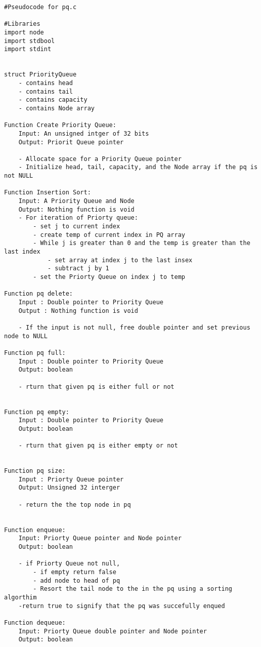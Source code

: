 \documentclass[11pt]{article} %
\begin{document}
\begin{flushleft}
\begin{lstlisting}
#Pseudocode for pq.c

#Libraries 
import node
import stdbool
import stdint


struct PriorityQueue
    - contains head
    - contains tail
    - contains capacity
    - contains Node array

Function Create Priority Queue:
    Input: An unsigned intger of 32 bits
    Output: Priorit Queue pointer
    
    - Allocate space for a Priority Queue pointer
    - Initialize head, tail, capacity, and the Node array if the pq is not NULL

Function Insertion Sort:
    Input: A Priority Queue and Node
    Output: Nothing function is void
    - For iteration of Priorty queue:
        - set j to current index
        - create temp of current index in PQ array
        - While j is greater than 0 and the temp is greater than the last index
            - set array at index j to the last insex
            - subtract j by 1
        - set the Priorty Queue on index j to temp

Function pq delete:
    Input : Double pointer to Priority Queue
    Output : Nothing function is void

    - If the input is not null, free double pointer and set previous node to NULL

Function pq full:
    Input : Double pointer to Priority Queue
    Output: boolean
    
    - rturn that given pq is either full or not


Function pq empty:
    Input : Double pointer to Priority Queue
    Output: boolean
    
    - rturn that given pq is either empty or not


Function pq size:
    Input : Priorty Queue pointer
    Output: Unsigned 32 interger
    
    - return the the top node in pq 


Function enqueue:
    Input: Priorty Queue pointer and Node pointer
    Output: boolean

    - if Priorty Queue not null, 
        - if empty return false
        - add node to head of pq
        - Resort the tail node to the in the pq using a sorting algorthim
    -return true to signify that the pq was succefully enqued 

Function dequeue:
    Input: Priorty Queue double pointer and Node pointer
    Output: boolean


\end{lstlisting}
\end{flushleft}
\end{document}
